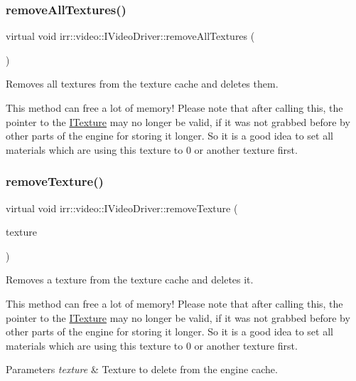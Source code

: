 \subsubsection{\texorpdfstring{remove\+All\+Textures()}{removeAllTextures()}}
{\footnotesize\ttfamily virtual void irr\+::video\+::\+I\+Video\+Driver\+::remove\+All\+Textures (\begin{DoxyParamCaption}{ }\end{DoxyParamCaption})\hspace{0.3cm}{\ttfamily [pure virtual]}}



Removes all textures from the texture cache and deletes them. 

This method can free a lot of memory! Please note that after calling this, the pointer to the \hyperlink{classirr_1_1video_1_1ITexture}{I\+Texture} may no longer be valid, if it was not grabbed before by other parts of the engine for storing it longer. So it is a good idea to set all materials which are using this texture to 0 or another texture first. \mbox{\label{classirr_1_1video_1_1IVideoDriver_ac88319ec41daa23fef2ae935285afcc9}} 
\subsubsection{\texorpdfstring{remove\+Texture()}{removeTexture()}}
{\footnotesize\ttfamily virtual void irr\+::video\+::\+I\+Video\+Driver\+::remove\+Texture (\begin{DoxyParamCaption}\item[{\hyperlink{classirr_1_1video_1_1ITexture}{I\+Texture} $\ast$}]{texture }\end{DoxyParamCaption})\hspace{0.3cm}{\ttfamily [pure virtual]}}



Removes a texture from the texture cache and deletes it. 

This method can free a lot of memory! Please note that after calling this, the pointer to the \hyperlink{classirr_1_1video_1_1ITexture}{I\+Texture} may no longer be valid, if it was not grabbed before by other parts of the engine for storing it longer. So it is a good idea to set all materials which are using this texture to 0 or another texture first. 
\begin{DoxyParams}{Parameters}
{\em texture} & Texture to delete from the engine cache. \\
\hline
\end{DoxyParams}
\mbox{\label{classirr_1_1video_1_1IVideoDriver_a2cefddb9ebd7f46ee946c04b301a5c5b}} 
